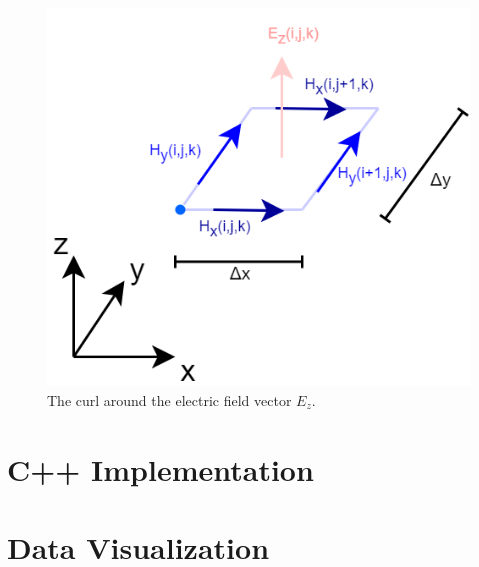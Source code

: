 \begin{figure}[h!]
	\centering
	\includegraphics[scale=0.5]{Figures/fdtd3dEzCurl}
	\decoRule
	\caption[3D $E_z$ vector curl]{The curl around the electric field vector $E_z$.}
	\label{fig:fdtd3dEzCurl}
\end{figure}





\section{C++ Implementation}

\section{Data Visualization}

